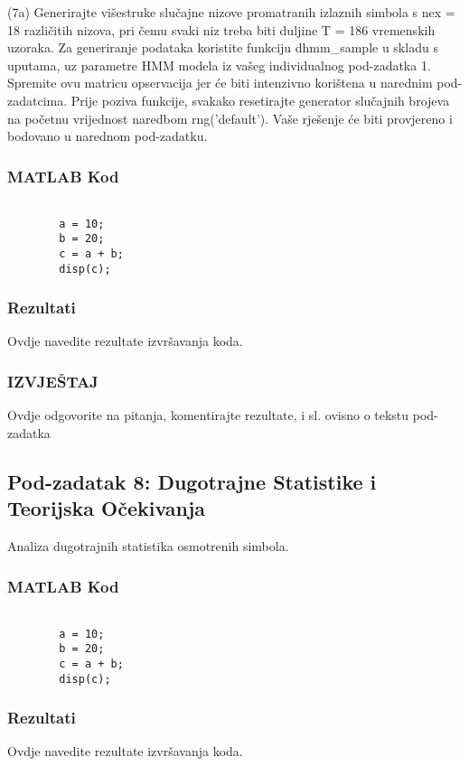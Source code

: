 \documentclass[12pt]{article}
\begin{document}
	(7a) Generirajte višestruke slučajne nizove promatranih izlaznih simbola s nex = 18 različitih nizova, pri čemu svaki niz treba biti duljine T = 186 vremenskih uzoraka. Za generiranje podataka koristite funkciju dhmm\_sample u skladu s uputama, uz parametre HMM modela iz vašeg individualnog pod-zadatka 1. Spremite ovu matricu opservacija jer će biti intenzivno korištena u narednim pod-zadatcima. Prije poziva funkcije, svakako resetirajte generator slučajnih brojeva na početnu vrijednost naredbom rng('default'). Vaše rješenje će biti provjereno i bodovano u narednom pod-zadatku.
	
	\subsubsection*{MATLAB Kod}
	\begin{lstlisting}
		
		a = 10;
		b = 20;
		c = a + b;
		disp(c);
	\end{lstlisting}
	
	\subsubsection*{Rezultati}
	Ovdje navedite rezultate izvršavanja koda.
	
	\subsubsection*{IZVJEŠTAJ}
	Ovdje odgovorite na pitanja, komentirajte rezultate, i sl. ovisno o tekstu pod-zadatka
	
	\subsection{Pod-zadatak 8: Dugotrajne Statistike i Teorijska Očekivanja}
	Analiza dugotrajnih statistika osmotrenih simbola.
	
	\subsubsection*{MATLAB Kod}
	\begin{lstlisting}
		
		a = 10;
		b = 20;
		c = a + b;
		disp(c);
	\end{lstlisting}
	
	\subsubsection*{Rezultati}
	Ovdje navedite rezultate izvršavanja koda.\newline
	
\end{document}
